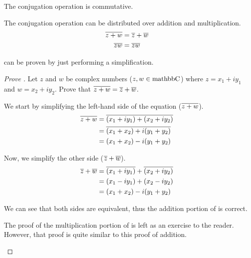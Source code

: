 \begin{propertylist}
\item The conjugation operation is commutative.
\item The conjugation operation can be distributed over addition and multiplication.\label{prop:Complex_Conjugate_Split}
  \begin{align*}
    \overline{z+w} &= \overline{z} + \overline{w} \\
    \overline{zw} &= \overline{z} \overline{w}
  \end{align*}
\end{propertylist}

 can be proven by just performing a simplification.
\begin{proof}[Prove ]
  Let $z$ and $w$ be complex numbers ($z, w \in \operatorname{mathbb{C}}$) where $z = x_{1} + iy_{1}$ and $w = x_{2} + iy_{2}$.
  Prove that $\overline{z + w} = \overline{z} + \overline{w}$.

  We start by simplifying the left-hand side of the equation ($\overline{z+w}$).
  \begin{align*}
    \overline{z + w} &= \overline{(x_{1} + iy_{1}) + (x_{2} + iy_{2})} \\
                     &= \overline{(x_{1} + x_{2}) + i(y_{1} + y_{2})} \\
                     &= (x_{1} + x_{2}) - i(y_{1} + y_{2}) \\
  \end{align*}

  Now, we simplify the other side ($\overline{z} + \overline{w}$).
  \begin{align*}
    \overline{z} + \overline{w} &= \overline{(x_{1} + iy_{1})} + \overline{(x_{2} + iy_{2})} \\
                                &= (x_{1} - iy_{1}) + (x_{2} - iy_{2}) \\
                                &= (x_{1} + x_{2}) - i(y_{1} + y_{2})
  \end{align*}

  We can see that both sides are equivalent, thus the addition portion of  is correct.

  \begin{remark*}
    The proof of the multiplication portion of  is left as an exercise to the reader.
    However, that proof is quite similar to this proof of addition.
  \end{remark*}
\end{proof}

